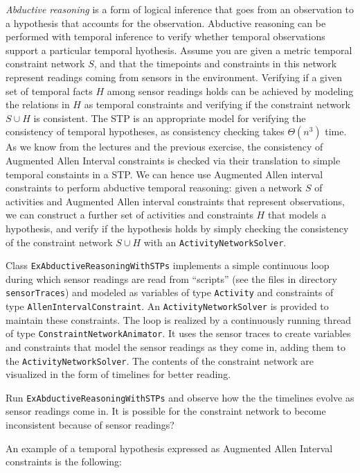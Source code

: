 \documentclass[a4paper]{article}
\begin{document}
{\em Abductive reasoning} is a form of logical inference that goes from an observation to a hypothesis that accounts for the observation.  Abductive reasoning can be performed with temporal inference to verify whether temporal observations support a particular temporal hyothesis.  Assume you are given a metric temporal constraint network $S$, and that the timepoints and constraints in this network represent readings coming from sensors in the environment.  Verifying if a given set of temporal facts $H$ among sensor readings holds can be achieved by modeling the relations in $H$ as temporal constraints and verifying if the constraint network $S \cup H$ is consistent.  The STP is an appropriate model for verifying the consistency of temporal hypotheses, as consistency checking takes $\Theta(n^3)$ time.  As we know from the lectures and the previous exercise, the consistency of Augmented Allen Interval constraints is checked via their translation to simple temporal constaints in a STP.  We can hence use Augmented Allen interval constraints to perform abductive temporal reasoning: given a network $S$ of activities and Augmented Allen interval constraints that represent observations, we can construct a further set of activities and constraints $H$ that models a hypothesis, and verify if the hypothesis holds by simply checking the consistency of the constraint network $S \cup H$ with an {\tt ActivityNetworkSolver}.

Class {\tt ExAbductiveReasoningWithSTPs} implements a simple continuous loop during which sensor readings are read from ``scripts'' (see the files in directory {\tt sensorTraces}) and modeled as variables of type {\tt Activity} and constraints of type {\tt AllenIntervalConstraint}.  An {\tt ActivityNetworkSolver} is provided to maintain these constraints.  The loop is realized by a continuously running thread of type {\tt ConstraintNetworkAnimator}.  It uses the sensor traces to create variables and constraints that model the sensor readings as they come in, adding them to the  {\tt ActivityNetworkSolver}. The contents of the constraint network are visualized in the form of timelines for better reading.

{\ex{}\label{ex:ex9}
Run {\tt ExAbductiveReasoningWithSTPs} and observe how the the timelines evolve as sensor readings come in.  It is possible for the constraint network to become inconsistent because of sensor readings?
\vspace{0.1cm}}

An example of a temporal hypothesis expressed as Augmented Allen Interval constraints is the following:
\end{document}
